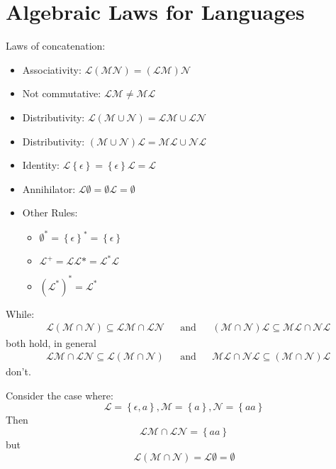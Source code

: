 \section{Algebraic Laws for Languages} %
\label{sec:algebraic_laws_for_languages}
Laws of concatenation:
\begin{itemize}
    \item Associativity: $\mathcal{L}(\mathcal{M}\mathcal{N}) = (\mathcal{L}\mathcal{M})\mathcal{N}$
    \item Not commutative: $\mathcal{L}\mathcal{M} \neq \mathcal{M}\mathcal{L}$
    \item Distributivity: $\mathcal{L}(\mathcal{M} \cup \mathcal{N}) = \mathcal{L}\mathcal{M} \cup \mathcal{L}\mathcal{N}$
    \item Distributivity: $(\mathcal{M} \cup \mathcal{N})\mathcal{L} = \mathcal{M}\mathcal{L} \cup \mathcal{N}\mathcal{L}$
    \item Identity: $\mathcal{L}\left\{ \epsilon \right\} = \left\{ \epsilon \right\}\mathcal{L} = \mathcal{L}$
    \item Annihilator: $\mathcal{L}\emptyset = \emptyset \mathcal{L} = \emptyset$
    \item Other Rules:
    \begin{itemize}
        \item $\emptyset^* = \left\{ \epsilon \right\}^* = \left\{ \epsilon \right\}$
        \item $\mathcal{L}^+ = \mathcal{L}\mathcal{L}* = \mathcal{L}^*\mathcal{L}$
        \item $(\mathcal{L}^*)^* = \mathcal{L}^*$
    \end{itemize}
\end{itemize}
\begin{Rem}
    While:
    \begin{align*}
        &\mathcal{L}(\mathcal{M} \cap \mathcal{N}) \subseteq \mathcal{L}\mathcal{M} \cap \mathcal{L}\mathcal{N}
        &&\mbox{and}
        &&(\mathcal{M} \cap \mathcal{N})\mathcal{L} \subseteq \mathcal{M}\mathcal{L} \cap \mathcal{N}\mathcal{L}
    \end{align*}
    both hold, in general
    \begin{align*}
        &\mathcal{L}\mathcal{M} \cap \mathcal{L}\mathcal{N} \subseteq \mathcal{L}(\mathcal{M} \cap \mathcal{N})
        &&\mbox{and}
        &&\mathcal{M}\mathcal{L} \cap \mathcal{N}\mathcal{L} \subseteq (\mathcal{M} \cap \mathcal{N})\mathcal{L}
    \end{align*}
    don't.
\end{Rem}
\begin{Ex}
    Consider the case where:
    \[
    \mathcal{L} = \left\{ \epsilon, a \right\},
    \mathcal{M} = \left\{ a \right\},
    \mathcal{N} = \left\{ aa \right\}
    \]
    Then
    \[
     \mathcal{L}\mathcal{M} \cap \mathcal{L}\mathcal{N} = \left\{ aa \right\}
    \] but
    \[
    \mathcal{L}(\mathcal{M} \cap \mathcal{N}) = \mathcal{L}\emptyset = \emptyset
    \]
\end{Ex}


